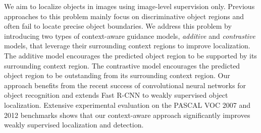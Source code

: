
We aim to localize objects in images using image-level supervision only.
Previous approaches to this problem mainly focus on discriminative object
regions and often fail to locate precise object boundaries. 
We address this problem by introducing two types of context-aware guidance models, {\em additive
} and {\em contrastive} models, that leverage their surrounding context regions to improve localization. 
The additive model encourages the predicted object region to be
supported by its surrounding context region. 
The contrastive model encourages the
predicted object region to be outstanding from its surrounding context region.
Our approach benefits from the recent success of convolutional neural networks
for object recognition and extends Fast R-CNN to weakly supervised object localization.
Extensive experimental evaluation on the PASCAL VOC 2007 and 2012 benchmarks shows that our context-aware approach significantly improves weakly supervised localization and detection.


